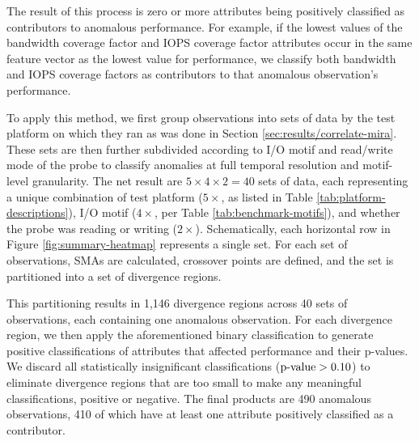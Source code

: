 
The result of this process is zero or more attributes being positively classified as contributors to anomalous performance.
For example, if the lowest values of the bandwidth coverage factor and IOPS coverage factor attributes occur in the same feature vector as the lowest value for performance, we classify both bandwidth and IOPS coverage factors as contributors to that anomalous observation's performance.

To apply this method, we first group observations into sets of data by the test platform on which they ran as was done in Section \ref{sec:results/correlate-mira}.
These sets are then further subdivided according to I/O motif and read/write mode of the probe to classify anomalies at full temporal resolution and motif-level granularity.
The net result are $5 \times 4 \times 2 = 40$ sets of data, each representing a unique combination of test platform ($5 \times$, as listed in Table \ref{tab:platform-descriptions}), I/O motif ($4 \times$, per Table \ref{tab:benchmark-motifs}), and whether the probe was reading or writing ($2 \times$).
Schematically, each horizontal row in Figure \ref{fig:summary-heatmap} represents a single set.
For each set of observations, SMAs are calculated, crossover points are defined, and the set is partitioned into a set of divergence regions.

This partitioning results in 1,146 divergence regions across 40 sets of observations, each containing one anomalous observation.
For each divergence region, we then apply the aforementioned binary classification to generate positive classifications of attributes that affected performance and their p-values.
We discard all statistically insignificant classifications ($\textup{p-value} > 0.10$) to eliminate divergence regions that are too small to make any meaningful classifications, positive or negative.
The final products are 490 anomalous observations, 410 of which have at least one attribute positively classified as a contributor.

